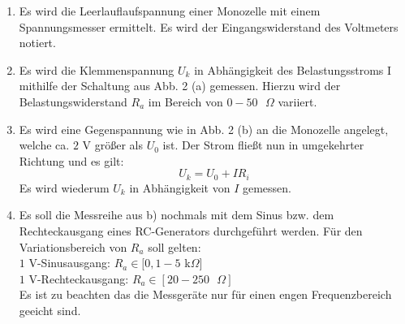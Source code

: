 \begin{enumerate}
    \item Es wird die Leerlauflaufspannung einer Monozelle mit einem Spannungsmesser ermittelt.
    Es wird der Eingangswiderstand des Voltmeters notiert.

    \item Es wird die Klemmenspannung $U_k$ in Abhängigkeit des Belastungsstroms I mithilfe
    der Schaltung aus Abb. 2 (a) gemessen.
    Hierzu wird der Belastungswiderstand $R_a$ im Bereich von $ 0-50\text{ }\Omega$ variiert.

    \item Es wird eine Gegenspannung wie in Abb. 2 (b) an die Monozelle angelegt, welche ca. $2$ V
    größer als $U_0$ ist. Der Strom fließt nun in umgekehrter Richtung und es gilt:
    \begin{equation}
	    U_k = U_0 + IR_i
    \end{equation}
    Es wird wiederum $U_k$ in Abhängigkeit von $I$ gemessen.

    \item Es soll die Messreihe aus b) nochmals mit dem Sinus bzw. dem
    Rechteckausgang eines RC-Generators durchgeführt werden. Für den Variationsbereich
    von $R_a$ soll gelten:\\
    $1$ V-Sinusausgang: $R_a \in [0,1 - 5 $ k$\Omega]$\\
    $1$ V-Rechteckausgang: $R_a \in [20 -250\text{ }\Omega]$\\
    Es ist zu beachten das die Messgeräte nur für einen engen Frequenzbereich geeicht sind.
\end{enumerate}
